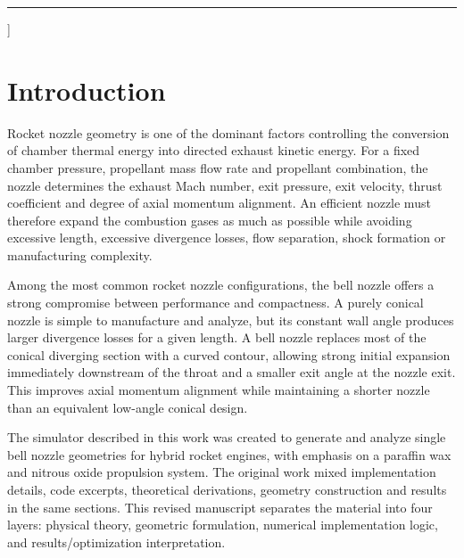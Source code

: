 \documentclass[11pt,a4paper]{article}
\begin{document}
\vspace{1em}
\noindent\rule{\linewidth}{0.4pt}
\vspace{1em}
]

\onecolumn
\newpage
\tableofcontents

\newpage
\listoffigures

\newpage

\section{Introduction}

Rocket nozzle geometry is one of the dominant factors controlling the conversion of chamber thermal energy into directed exhaust kinetic energy. For a fixed chamber pressure, propellant mass flow rate and propellant combination, the nozzle determines the exhaust Mach number, exit pressure, exit velocity, thrust coefficient and degree of axial momentum alignment. An efficient nozzle must therefore expand the combustion gases as much as possible while avoiding excessive length, excessive divergence losses, flow separation, shock formation or manufacturing complexity.

Among the most common rocket nozzle configurations, the bell nozzle offers a strong compromise between performance and compactness. A purely conical nozzle is simple to manufacture and analyze, but its constant wall angle produces larger divergence losses for a given length. A bell nozzle replaces most of the conical diverging section with a curved contour, allowing strong initial expansion immediately downstream of the throat and a smaller exit angle at the nozzle exit. This improves axial momentum alignment while maintaining a shorter nozzle than an equivalent low-angle conical design.

The simulator described in this work was created to generate and analyze single bell nozzle geometries for hybrid rocket engines, with emphasis on a paraffin wax and nitrous oxide propulsion system. The original work mixed implementation details, code excerpts, theoretical derivations, geometry construction and results in the same sections. This revised manuscript separates the material into four layers: physical theory, geometric formulation, numerical implementation logic, and results/optimization interpretation.
\end{document}
